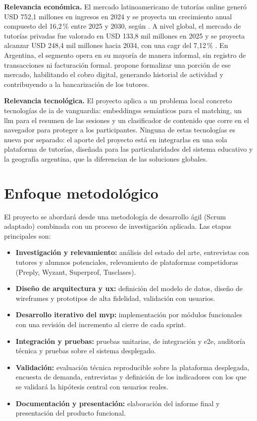 \textbf{Relevancia económica.} El mercado latinoamericano de tutorías
online generó USD 752,1 millones en ingresos en 2024 y se proyecta un
crecimiento anual compuesto del 16,2\,\% entre 2025 y 2030, según
\citet{grandview2024}. A nivel global, el mercado de tutorías privadas
fue valorado en USD 133,8 mil millones en 2025 y se proyecta alcanzar
USD 248,4 mil millones hacia 2034, con una \gls{cagr} del 7,12\,\%
\citep{imarc2026}. En Argentina, el segmento opera en su
mayoría de manera informal, sin registro de transacciones ni
facturación formal. \sistema{} propone formalizar una porción de ese
mercado, habilitando el cobro digital, generando historial de actividad
y contribuyendo a la bancarización de los tutores.

\textbf{Relevancia tecnológica.} El proyecto aplica a un problema local
concreto tecnologías de \gls{ia} de vanguardia: \glspl{embeddings}
semánticos para el \gls{matching}, un \gls{llm} para el resumen de las sesiones y un clasificador de
contenido que corre en el navegador para proteger a los participantes.
Ninguna de estas tecnologías es nueva por separado: el aporte del
proyecto está en integrarlas en una sola plataforma de tutorías,
diseñada para las particularidades del sistema educativo y la geografía
argentina, que la diferencian de las soluciones globales.

\section{Enfoque metodológico}\label{sec:enfoque}

El proyecto se abordará desde una metodología de desarrollo ágil (Scrum
adaptado) combinada con un proceso de investigación aplicada. Las etapas
principales son:

\begin{itemize}
    \item \textbf{Investigación y relevamiento:} análisis del estado del
          arte, entrevistas con tutores y alumnos potenciales,
          relevamiento de plataformas competidoras (Preply, Wyzant,
          Superprof, Tusclases).
    \item \textbf{Diseño de arquitectura y \gls{ux}:} definición del modelo
          de datos, diseño de wireframes y prototipos de alta fidelidad,
          validación con usuarios.
    \item \textbf{Desarrollo iterativo del \gls{mvp}:} implementación por
          módulos funcionales con una revisión del incremento al cierre de
          cada sprint.
    \item \textbf{Integración y pruebas:} pruebas unitarias, de
          integración y \gls{e2e}, auditoría técnica y pruebas sobre el
          sistema desplegado.
    \item \textbf{Validación:} evaluación técnica reproducible sobre la
          plataforma desplegada, encuesta de demanda, entrevistas y
          definición de los indicadores con los que se validará la
          hipótesis central con usuarios reales.
    \item \textbf{Documentación y presentación:} elaboración del informe
          final y presentación del producto funcional.
\end{itemize}


